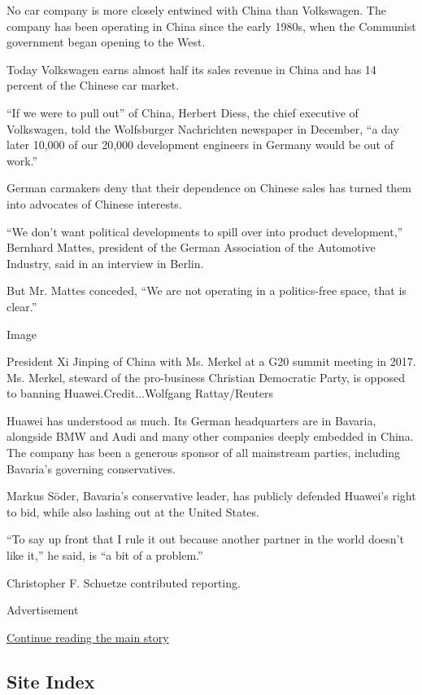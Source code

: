 No car company is more closely entwined with China than Volkswagen. The
company has been operating in China since the early 1980s, when the
Communist government began opening to the West.

Today Volkswagen earns almost half its sales revenue in China and has 14
percent of the Chinese car market.

``If we were to pull out'' of China, Herbert Diess, the chief executive
of Volkswagen, told the Wolfsburger Nachrichten newspaper in December,
``a day later 10,000 of our 20,000 development engineers in Germany
would be out of work.''

German carmakers deny that their dependence on Chinese sales has turned
them into advocates of Chinese interests.

``We don't want political developments to spill over into product
development,'' Bernhard Mattes, president of the German Association of
the Automotive Industry, said in an interview in Berlin.

But Mr. Mattes conceded, ``We are not operating in a politics-free
space, that is clear.''

Image

President Xi Jinping of China with Ms. Merkel at a G20 summit meeting in
2017. Ms. Merkel, steward of the pro-business Christian Democratic
Party, is opposed to banning Huawei.Credit...Wolfgang Rattay/Reuters

Huawei has understood as much. Its German headquarters are in Bavaria,
alongside BMW and Audi and many other companies deeply embedded in
China. The company has been a generous sponsor of all mainstream
parties, including Bavaria's governing conservatives.

Markus Söder, Bavaria's conservative leader, has publicly defended
Huawei's right to bid, while also lashing out at the United States.

``To say up front that I rule it out because another partner in the
world doesn't like it,'' he said, is ``a bit of a problem.''

Christopher F. Schuetze contributed reporting.

Advertisement

\protect\hyperlink{after-bottom}{Continue reading the main story}

\hypertarget{site-index}{%
\subsection{Site Index}\label{site-index}}

